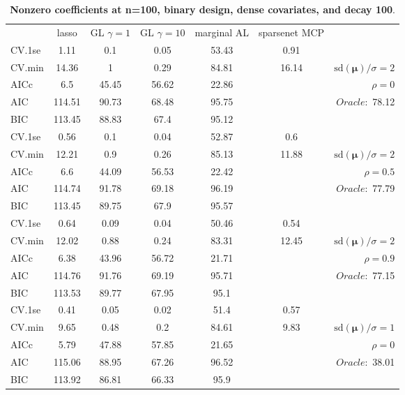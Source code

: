 \begin{table}\vspace{-.5cm}
\caption[l]{ { \bf Nonzero coefficients at n=100, binary design, 
dense covariates, and  decay  100}.}
\vspace{-.5cm}
\footnotesize{}
\begin{center}
\begin{tabular}{l*{5}{c}|r}
& lasso & GL $\gamma=1$ & GL $\gamma=10$ & marginal AL & sparsenet MCP  & \\
 \cline{1-7}
CV.1se & 1.11 & 0.1 & 0.05 & 53.43 & 0.91 & \\
CV.min & 14.36 & 1 & 0.29 & 84.81 & 16.14 &  $\mathrm{sd}(\mathbf{\mu})/\sigma=2$ \\
AICc & 6.5 & 45.45 & 56.62 & 22.86 & & $\rho=0$ \\
AIC & 114.51 & 90.73 & 68.48 & 95.75 & &  \multirow{2}{*}{$Oracle: $ 78.12} \\
BIC & 113.45 & 88.83 & 67.4 & 95.12 & &  \\
 \hline 
CV.1se & 0.56 & 0.1 & 0.04 & 52.87 & 0.6 & \\
CV.min & 12.21 & 0.9 & 0.26 & 85.13 & 11.88 &  $\mathrm{sd}(\mathbf{\mu})/\sigma=2$ \\
AICc & 6.6 & 44.09 & 56.53 & 22.42 & & $\rho=0.5$ \\
AIC & 114.74 & 91.78 & 69.18 & 96.19 & &  \multirow{2}{*}{$Oracle: $ 77.79} \\
BIC & 113.45 & 89.75 & 67.9 & 95.57 & &  \\
 \hline 
CV.1se & 0.64 & 0.09 & 0.04 & 50.46 & 0.54 & \\
CV.min & 12.02 & 0.88 & 0.24 & 83.31 & 12.45 &  $\mathrm{sd}(\mathbf{\mu})/\sigma=2$ \\
AICc & 6.38 & 43.96 & 56.72 & 21.71 & & $\rho=0.9$ \\
AIC & 114.76 & 91.76 & 69.19 & 95.71 & &  \multirow{2}{*}{$Oracle: $ 77.15} \\
BIC & 113.53 & 89.77 & 67.95 & 95.1 & &  \\
 \hline 
CV.1se & 0.41 & 0.05 & 0.02 & 51.4 & 0.57 & \\
CV.min & 9.65 & 0.48 & 0.2 & 84.61 & 9.83 &  $\mathrm{sd}(\mathbf{\mu})/\sigma=1$ \\
AICc & 5.79 & 47.88 & 57.85 & 21.65 & & $\rho=0$ \\
AIC & 115.06 & 88.95 & 67.26 & 96.52 & &  \multirow{2}{*}{$Oracle: $ 38.01} \\
BIC & 113.92 & 86.81 & 66.33 & 95.9 & &  \\

\end{tabular}
\end{center}
\end{table}
